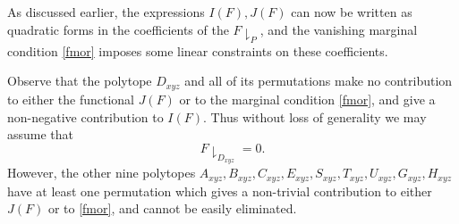 \documentclass{bmcart}
\theoremstyle{plain}
\theoremstyle{definition}
\begin{document}
As discussed earlier, the expressions $I(F), J(F)$ can now be written as quadratic forms in the coefficients of the $F\downharpoonright_P$, and the vanishing marginal condition \eqref{fmor} imposes some linear constraints on these coefficients.

Observe that the polytope $D_{xyz}$ and all of its permutations make no contribution to either the functional $J(F)$ or to the marginal condition \eqref{fmor}, and give a non-negative contribution to $I(F)$.  Thus without loss of generality we may assume that
$$ F\downharpoonright_{D_{xyz}} = 0.$$
However, the other nine polytopes $A_{xyz}, B_{xyz}, C_{xyz}, E_{xyz}, S_{xyz}, T_{xyz}, U_{xyz}, G_{xyz}, H_{xyz}$ have at least one permutation which gives a non-trivial contribution to either $J(F)$ or to \eqref{fmor}, and cannot be easily eliminated.
\end{document}
